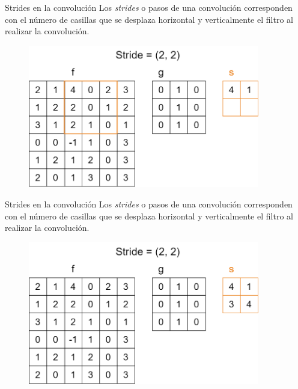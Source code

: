 \begin{frame}{Strides en la convolución}
Los \alert{\textit{strides}} o pasos de una convolución corresponden con el número de casillas que se desplaza \alert{horizontal} y \alert{verticalmente} el filtro al realizar la convolución.

\begin{figure}
    \centering
    \includegraphics[width=0.9\textwidth]{figures/Tema 2/Strides2x2_3.png}
\end{figure}
\end{frame}

\begin{frame}{Strides en la convolución}
Los \alert{\textit{strides}} o pasos de una convolución corresponden con el número de casillas que se desplaza \alert{horizontal} y \alert{verticalmente} el filtro al realizar la convolución.

\begin{figure}
    \centering
    \includegraphics[width=0.9\textwidth]{figures/Tema 2/Strides2x2_Res.png}
\end{figure}
\end{frame}

